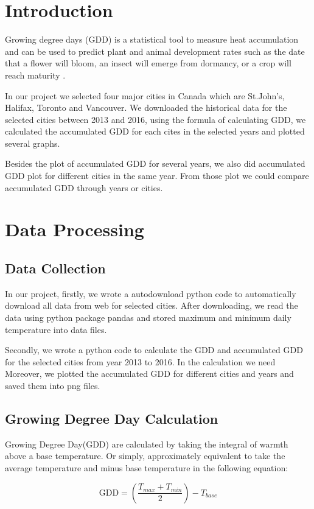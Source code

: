 \documentclass[12pt]{article}
\begin{document}
\section{ \bf Introduction}
Growing degree days (GDD) is a statistical tool to measure heat accumulation and can be used to predict plant and animal development rates such as the date that a flower will bloom, an insect will emerge from dormancy, or a crop will reach maturity \cite{1}.


In our project we selected four major cities in Canada which are St.John's, Halifax, Toronto and Vancouver. We downloaded the historical data for the selected cities between 2013 and 2016, using the formula of calculating GDD, we calculated the accumulated GDD for each cites in the selected years and plotted several graphs.

Besides the plot of accumulated GDD for several years, we also did accumulated GDD plot for different cities in the same year. From those plot we could compare accumulated GDD through years or cities. 


\section{ \bf Data Processing}
\subsection{Data Collection}
In our project, firstly, we wrote a autodownload python code to automatically download all data from web for selected cities. After downloading, we read the data using python package pandas and stored  maximum and minimum daily temperature into data files.

Secondly, we wrote a python code to calculate the GDD and accumulated GDD for the selected cities from year 2013 to 2016. In the calculation we need Moreover, we plotted the accumulated GDD for different cities and years and saved them into png files. 



\subsection{Growing Degree Day Calculation}
Growing Degree Day(GDD) are calculated by taking the integral of warmth above a base temperature. Or simply, approximately equivalent to take the average temperature and minus base temperature in the following equation:

\begin{equation}
\textrm{GDD} = \left(\frac{T_{max} + T_{min}}{2}\right) - T_{base}
\end{equation}
\end{document}
